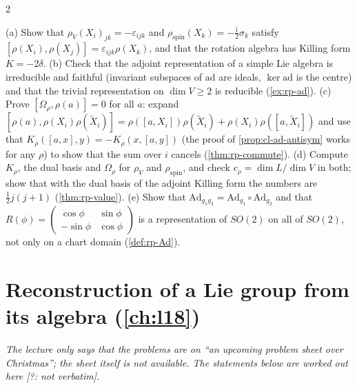 \begin{paracol}{2}
\begin{exercise}\label{ex:rp-full}
(a) Show that $\rho_V(X_i)_{jk}=-\varepsilon_{ijk}$ and $\rho_{\mathrm{spin}}(X_k)=-\frac{\mathrm i}{2}\sigma_k$ satisfy $[\rho(X_i),\rho(X_j)]=\varepsilon_{ijk}\rho(X_k)$, and that the rotation algebra has Killing form $K=-2\delta$. (b) Check that the adjoint representation of a simple Lie algebra is irreducible and faithful (invariant subspaces of $\mathrm{ad}$ are ideals, $\ker\mathrm{ad}$ is the centre) and that the trivial representation on $\dim V\geq2$ is reducible (\cref{ex:rp-ad}). (c) Prove $[\Omega_\rho,\rho(a)]=0$ for all $a$: expand $[\rho(a),\rho(X_i)\rho(\tilde X_i)]=\rho([a,X_i])\rho(\tilde X_i)+\rho(X_i)\rho([a,\tilde X_i])$ and use that $K_\rho([a,x],y)=-K_\rho(x,[a,y])$ (the proof of \cref{prop:cl-ad-antisym} works for any $\rho$) to show that the sum over $i$ cancels (\cref{thm:rp-commute}). (d) Compute $K_\rho$, the dual basis and $\Omega_\rho$ for $\rho_V$ and $\rho_{\mathrm{spin}}$, and check $c_\rho=\dim L/\dim V$ in both; show that with the dual basis of the adjoint Killing form the numbers are $\frac12j(j+1)$ (\cref{thm:rp-value}). (e) Show that $\mathrm{Ad}_{g_1g_2}=\mathrm{Ad}_{g_1}\circ\mathrm{Ad}_{g_2}$ and that $R(\phi)=\begin{pmatrix}\cos\phi&\sin\phi\\-\sin\phi&\cos\phi\end{pmatrix}$ is a representation of $SO(2)$ on all of $SO(2)$, not only on a chart domain (\cref{def:rp-Ad}).
\end{exercise}

\section{Reconstruction of a Lie group from its algebra (\cref{ch:l18})}\label{exam:ch18}

\emph{The lecture only says that the problems are on ``an upcoming problem sheet over Christmas''; the sheet itself is not available. The statements below are worked out here [?: not verbatim].}


\end{paracol}
